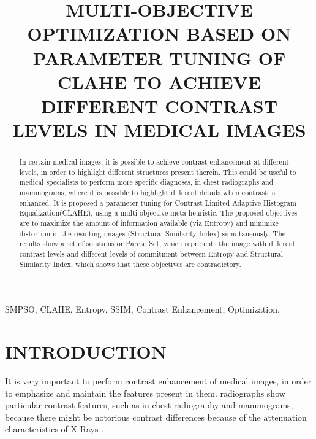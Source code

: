 \documentclass[spanish,twocolumn]{article}
\title{MULTI-OBJECTIVE OPTIMIZATION BASED ON PARAMETER TUNING OF CLAHE TO ACHIEVE DIFFERENT CONTRAST LEVELS IN MEDICAL IMAGES}
\begin{document}
%
\maketitle
%
\begin{abstract}
In certain medical images, it is possible to achieve contrast enhancement at different levels, in order to highlight different structures present therein. This could be useful to medical specialists to perform more specific diagnoses, in chest radiographs and mammograms, where it is possible to highlight different details when contrast is enhanced. It is proposed a parameter tuning for Contrast Limited Adaptive Histogram Equalization(CLAHE), using a multi-objective meta-heuristic. The proposed objectives are to maximize the amount of information available (via Entropy) and minimize distortion in the resulting images (Structural Similarity Index) simultaneously. The results show a set of solutions or Pareto Set, which represents the image with different contrast levels and different levels of commitment between Entropy and Structural Similarity Index, which shows that these objectives are contradictory.

\end{abstract}
%
\begin{keywords}
SMPSO, CLAHE, Entropy, SSIM, Contrast Enhancement, Optimization.
\end{keywords}
%
\section{INTRODUCTION}
\label{sec:intro}

It is very important to perform contrast enhancement of medical images, in order to emphasize and maintain the features present in them. radiographs show particular contrast features, such as in chest radiography and mammograms, because there might be notorious contrast differences because of the attenuation characteristics of X-Rays \cite{chang1998image}. 
\end{document}

